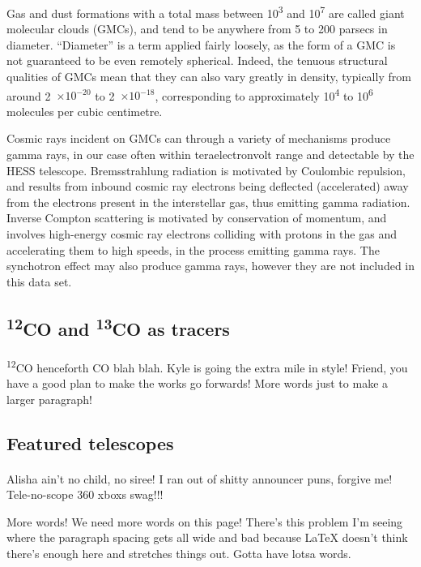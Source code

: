 \documentclass[a4paper, titlepage, oneside]{article}
\newcommand{\elem}[2]{\textsuperscript{#1}{#2}}
\newcommand{\e}[1]{\ensuremath{\times 10^{#1}}}
\newcommand{\smass}{\mathrm{M_\odot}}
\begin{document}
\begin{multicols}{2}
Gas and dust formations with a total mass between \unit{10^3} and \unit{10^7}{\smass} are called giant molecular clouds (GMCs), and tend to be anywhere from 5 to 200 parsecs in diameter. \parencite{apj1} ``Diameter'' is a term applied fairly loosely, as the form of a GMC is not guaranteed to be even remotely spherical. Indeed, the tenuous structural qualities of GMCs mean that they can also vary greatly in density, typically from around \unit{2\e{-20}} to \unit{2\e{-18}}{\gram\usk\centi\metre\rpcubed}, corresponding to approximately \unit{10^4} to \unit{10^6} molecules per cubic centimetre. \parencite{rmp1}

Cosmic rays incident on GMCs can through a variety of mechanisms produce gamma rays, in our case often within teraelectronvolt range and detectable by the HESS telescope. Bremsstrahlung radiation is motivated by Coulombic repulsion, and results from inbound cosmic ray electrons being deflected (accelerated) away from the electrons present in the interstellar gas, thus emitting gamma radiation. Inverse Compton scattering is motivated by conservation of momentum, and involves high-energy cosmic ray electrons colliding with protons in the gas and accelerating them to high speeds, in the process emitting gamma rays. \parencite{rmp1} The synchotron effect may also produce gamma rays, however they are not included in this data set.

\subsection{\elem{12}{CO} and \elem{13}{CO} as tracers}
\paragraph{}
\elem{12}{CO} henceforth CO blah blah. Kyle is going the extra mile in style! Friend, you have a good plan to make the works go forwards! More words just to make a larger paragraph!

\subsection{Featured telescopes}
\paragraph{}
Alisha ain't no child, no siree! I ran out of shitty announcer puns, forgive me! Tele-no-scope 360 xboxs swag!!!

More words! We need more words on this page! There's this problem I'm seeing where the paragraph spacing gets all wide and bad because \LaTeX\: doesn't think there's enough here and stretches things out. Gotta have lotsa words.


\end{multicols}
\end{document}
